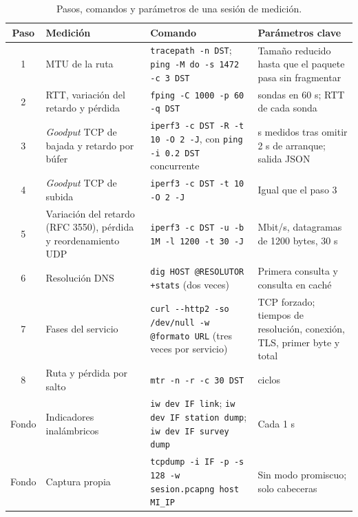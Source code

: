 \begin{table}[htbp]
  \centering
  \caption{Pasos, comandos y parámetros de una sesión de medición.}
  \label{tab:secuencia}
  \scriptsize
  \renewcommand{\arraystretch}{1.25}
  \begin{tabularx}{\textwidth}{|c|p{2.5cm}|>{\raggedright\arraybackslash}X|>{\raggedright\arraybackslash}p{3.3cm}|}
    \hline
    \textbf{Paso} & \textbf{Medición} & \textbf{Comando} & \textbf{Parámetros clave} \\
    \hline
    1 & MTU de la ruta & \texttt{tracepath -n DST}; \texttt{ping -M do -s 1472 -c 3 DST} & Tamaño reducido hasta que el paquete pasa sin fragmentar \\
    \hline
    2 & RTT, variación del retardo y pérdida & \texttt{fping -C 1000 -p 60 -q DST} & 1000 sondas en 60 s; RTT de cada sonda \\
    \hline
    3 & \textit{Goodput} TCP de bajada y retardo por búfer & \texttt{iperf3 -c DST -R -t 10 -O 2 -J}, con \texttt{ping -i 0.2 DST} concurrente & 10 s medidos tras omitir 2 s de arranque; salida JSON \\
    \hline
    4 & \textit{Goodput} TCP de subida & \texttt{iperf3 -c DST -t 10 -O 2 -J} & Igual que el paso 3 \\
    \hline
    5 & Variación del retardo (RFC 3550), pérdida y reordenamiento UDP & \texttt{iperf3 -c DST -u -b 1M -l 1200 -t 30 -J} & 1 Mbit/s, datagramas de 1200 bytes, 30 s \\
    \hline
    6 & Resolución DNS & \texttt{dig HOST @RESOLUTOR +stats} (dos veces) & Primera consulta y consulta en caché \\
    \hline
    7 & Fases del servicio & \texttt{curl -{}-http2 -so /dev/null -w @formato URL} (tres veces por servicio) & TCP forzado; tiempos de resolución, conexión, TLS, primer byte y total \\
    \hline
    8 & Ruta y pérdida por salto & \texttt{mtr -n -r -c 30 DST} & 30 ciclos \\
    \hline
    Fondo & Indicadores inalámbricos & \texttt{iw dev IF link}; \texttt{iw dev IF station dump}; \texttt{iw dev IF survey dump} & Cada 1 s \\
    \hline
    Fondo & Captura propia & \texttt{tcpdump -i IF -p -s 128 -w sesion.pcapng host MI\_IP} & Sin modo promiscuo; solo cabeceras \\
    \hline
  \end{tabularx}
  \vspace{2pt}
  \raggedright
\end{table}

